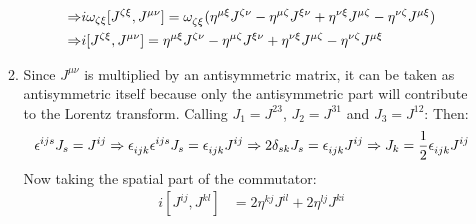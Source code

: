 \documentclass[12pt,a4]{article}
\begin{document}
\begin{enumerate}
\begin{enumerate}
\begin{align*}
      \Rightarrow & i \omega_{\zeta\xi} [J^{\zeta\xi},J^{\mu\nu}]  = \tensor{\omega}{_\zeta_\xi}(\eta^{\mu\xi}J^{\zeta\nu} - \eta^{\mu\zeta}J^{\xi\nu} + \eta^{\nu\xi}J^{\mu\zeta} - \eta^{\nu\zeta}J^{\mu\xi})\\
      \Rightarrow & i[J^{\zeta\xi},J^{\mu\nu}]  = \eta^{\mu\xi}J^{\zeta\nu} - \eta^{\mu\zeta}J^{\xi\nu} + \eta^{\nu\xi}J^{\mu\zeta} - \eta^{\nu\zeta}J^{\mu\xi}
    \end{align*}
  \item
    Since $J^{\mu\nu}$ is multiplied by an antisymmetric matrix, it can be taken as antisymmetric itself because only the antisymmetric part will contribute to the Lorentz transform.
    Calling $J_1 = J^{23}$, $J_2 = J^{31}$ and $J_3 = J^{12}$:
    Then:
    \begin{equation*}
      \tensor{\epsilon}{^i^j^s} J_s = J^{ij} \Rightarrow \tensor{\epsilon}{_i_j_k}\tensor{\epsilon}{^i^j^s} J_s = \tensor{\epsilon}{_i_j_k}J^{ij} \Rightarrow 2 \delta_{sk} J_s = \tensor{\epsilon}{_i_j_k}J^{ij} \Rightarrow J_k = \frac{1}{2}\tensor{\epsilon}{_i_j_k}J^{ij}
    \end{equation*}
    Now taking the spatial part of the commutator:
    \begin{align*}
      i [J^{ij},J^{kl}] 
                        &= 2\eta^{k j} J^{il} + 2\eta^{l j}J^{ki}\\

\end{align*}
\end{enumerate}
\end{enumerate}
\end{document}
